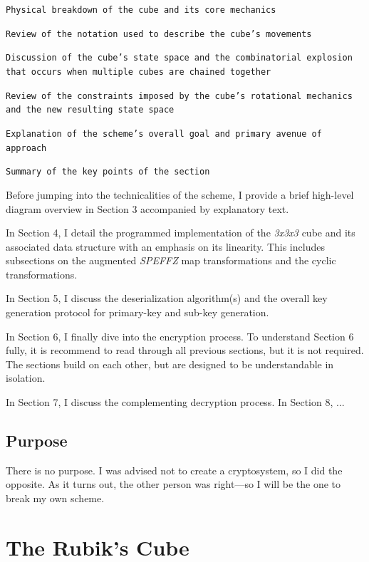 \documentclass[12pt]{article}
\begin{document}
\begin{verbenumerate}
    \item \texttt{Physical breakdown of the cube and its core mechanics}
    \item \texttt{Review of the notation used to describe the cube's movements}
    \item \texttt{Discussion of the cube's state space and the combinatorial explosion that occurs when multiple cubes are chained together}
    \item \texttt{Review of the constraints imposed by the cube's rotational mechanics and the new resulting state space}
    \item \texttt{Explanation of the scheme's overall goal and primary avenue of approach}
    \item \texttt{Summary of the key points of the section}
\end{verbenumerate}

Before jumping into the technicalities of the scheme, I provide a brief high-level diagram overview in Section 3 accompanied by explanatory text. 

In Section 4, I detail the programmed implementation of the \textit{3x3x3} cube and its associated data structure with an emphasis on its linearity. This includes subsections on the augmented \textit{SPEFFZ} map transformations and the cyclic transformations. 

In Section 5, I discuss the deserialization algorithm(s) and the overall key generation protocol for primary-key and sub-key generation. 

In Section 6, I finally dive into the encryption process. To understand Section 6 fully, it is recommend to read through all previous sections, but it is not required. The sections build on each other, but are designed to be understandable in isolation. 

In Section 7, I discuss the complementing decryption process. In Section 8, ...

\subsection{Purpose}
There is no purpose. I was advised not to create a cryptosystem, so I did the opposite. As it turns out, the other person was right—so I will be the one to break my own scheme.

\newpage

\section{The Rubik's Cube}
\end{document}
